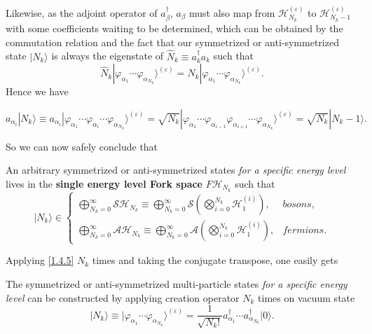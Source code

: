 \documentclass[b5paper,10pt,UTF8]{book}
\numberwithin{equation}{section}
\begin{document}
 		Likewise, as the adjoint operator of $a^\dagger_\beta$, $a_\beta$ must also map from $\mathcal{H}_{N_k}^{(\varepsilon)}$ to $\mathcal{H}_{N_k-1}^{(\varepsilon)}$ with some coefficients waiting to be determined, which can be obtained by the commutation relation and the fact that our symmetrized or anti-symmetrized state $|N_k\rangle$ is always the eigenstate of $\hat{N}_k\equiv a^\dagger_k a_k$ such that
 		\begin{equation}\label{1.4.4}
 			\hat{N}_k|\varphi_{\alpha_1}\cdots\varphi_{\alpha_{N_k}}\rangle^{(\varepsilon)}=N_k|\varphi_{\alpha_1}\cdots\varphi_{\alpha_{N_k}}\rangle^{(\varepsilon)}.
 		\end{equation}
 		Hence we have
 		\begin{Corollary}
	 		\begin{equation}\label{1.4.5}
 				a_{\alpha_i}|N_k\rangle\equiv a_{\alpha_i}|\varphi_{\alpha_1}\cdots\varphi_{\alpha_i}\cdots\varphi_{\alpha_{N_k}}\rangle^{(\varepsilon)}=\sqrt{N_k}|\varphi_{\alpha_1}\cdots\varphi_{\alpha_{i-1}}\varphi_{\alpha_{i+1}}\cdots\varphi_{\alpha_{N_k}}\rangle^{(\varepsilon)}=\sqrt{N_k}|N_k-1\rangle.
 			\end{equation}
		\end{Corollary}
		So we can now safely conclude that 
		\begin{Proposition}
			An arbitrary symmetrized or anti-symmetrized states \emph{for a specific energy level} lives in the \textbf{single energy level Fork space} $F\mathcal{H}_{N_k}$ such that
			$$|N_k\rangle\in
				\begin{cases}
					\displaystyle\bigoplus_{N_k=0}^\infty\mathcal{SH}_{N_k}\equiv\bigoplus_{N_k=0}^\infty\mathcal{S}\left(\bigotimes_{i=0}^{N_k}\mathcal{H}_1^{(i)}\right),&bosons,\\
					\displaystyle\bigoplus_{N_k=0}^\infty\mathcal{AH}_{N_k}\equiv\bigoplus_{N_k=0}^\infty\mathcal{A}\left(\bigotimes_{i=0}^{N_k}\mathcal{H}_1^{(i)}\right),&fermions.
				\end{cases}$$
		
		\end{Proposition}
		Applying \eqref{1.4.5} $N_k$ times and taking the conjugate transpose, one easily gets
		\begin{Proposition}
			The symmetrized or anti-symmetrized multi-particle states \emph{for a specific energy level} can be constructed by applying creation operator $N_k$ times on vacuum state
			\begin{equation}\label{1.4.6}
				|N_k\rangle\equiv|\varphi_{\alpha_1}\cdots\varphi_{\alpha_{N_k}}\rangle^{(\varepsilon)}=\dfrac{1}{\sqrt{N_k!}}a_{\alpha_1}^\dagger\cdots a_{\alpha_{N_k}}^\dagger|0\rangle.
			\end{equation}
		\end{Proposition}
\end{document}
